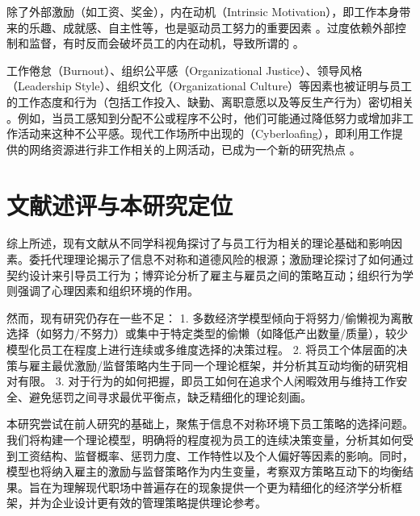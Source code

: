 除了外部激励（如工资、奖金），内在动机（Intrinsic Motivation），即工作本身带来的乐趣、成就感、自主性等，也是驱动员工努力的重要因素 \citep{deci1985intrinsic}。过度依赖外部控制和监督，有时反而会破坏员工的内在动机，导致所谓的 \citep{frey1997not}。

工作倦怠（Burnout）、组织公平感（Organizational Justice）、领导风格（Leadership Style）、组织文化（Organizational Culture）等因素也被证明与员工的工作态度和行为（包括工作投入、缺勤、离职意愿以及等反生产行为）密切相关 \citep{maslach2001job, colquitt2001organizational}。例如，当员工感知到分配不公或程序不公时，他们可能通过降低努力或增加非工作活动来这种不公平感。现代工作场所中出现的（Cyberloafing），即利用工作提供的网络资源进行非工作相关的上网活动，已成为一个新的研究热点 \citep{lim2002it}。

\section{文献述评与本研究定位}

综上所述，现有文献从不同学科视角探讨了与员工行为相关的理论基础和影响因素。委托代理理论揭示了信息不对称和道德风险的根源；激励理论探讨了如何通过契约设计来引导员工行为；博弈论分析了雇主与雇员之间的策略互动；组织行为学则强调了心理因素和组织环境的作用。

然而，现有研究仍存在一些不足：
1.  多数经济学模型倾向于将努力/偷懒视为离散选择（如努力/不努力）或集中于特定类型的偷懒（如降低产出数量/质量），较少模型化员工在程度上进行连续或多维度选择的决策过程。
2.  将员工个体层面的决策与雇主最优激励/监督策略内生于同一个理论框架，并分析其互动均衡的研究相对有限。
3.  对于行为的如何把握，即员工如何在追求个人闲暇效用与维持工作安全、避免惩罚之间寻求最优平衡点，缺乏精细化的理论刻画。

本研究尝试在前人研究的基础上，聚焦于信息不对称环境下员工策略的选择问题。我们将构建一个理论模型，明确将的程度视为员工的连续决策变量，分析其如何受到工资结构、监督概率、惩罚力度、工作特性以及个人偏好等因素的影响。同时，模型也将纳入雇主的激励与监督策略作为内生变量，考察双方策略互动下的均衡结果。旨在为理解现代职场中普遍存在的现象提供一个更为精细化的经济学分析框架，并为企业设计更有效的管理策略提供理论参考。
